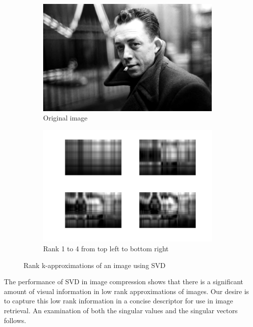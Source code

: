 \documentclass{report}
\begin{document}
\begin{figure}[H]
        \centering
        \begin{subfigure}[b]{0.4\textwidth}
                \includegraphics[width=\textwidth]{graphics/guy.jpg}
                \caption{Original image}
        \end{subfigure}
        \begin{subfigure}[b]{0.4\textwidth}
                \includegraphics[width=\textwidth]{graphics/guyTopCompressions.png}
                \caption{Rank 1 to 4 from top left to bottom right}
        \end{subfigure}
        \caption{Rank k-approximations of an image using SVD}\label{fig:svd_compression}
\end{figure}

The performance of SVD in image compression shows that there is a significant amount of visual information in low rank approximations of images. Our desire is to capture this low rank information in a concise descriptor for use in image retrieval. An examination of both the singular values and the singular vectors follows.
\end{document}
